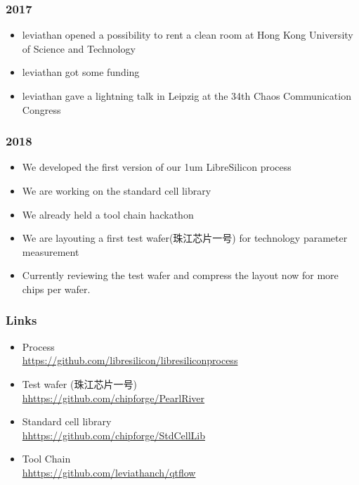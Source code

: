 \documentclass{beamer}
\begin{document}
\begin{frame}
	\frametitle{2017}
	\begin{itemize}
		\item leviathan opened a possibility to rent a clean room at Hong Kong University of Science and Technology
		\item leviathan got some funding
		\item leviathan gave a lightning talk in Leipzig at the 34th Chaos Communication Congress
	\end{itemize}
\end{frame}


\begin{frame}
	\frametitle{2018}
	\begin{itemize}
		\item We developed the first version of our 1um LibreSilicon process
		\item We are working on the standard cell library
		\item We already held a tool chain hackathon
		\item We are layouting a first test wafer({珠江芯片一号}) for technology parameter measurement
		\item Currently reviewing the test wafer and compress the layout now for more chips per wafer.
	\end{itemize}
\end{frame}

\begin{frame}
	\frametitle{Links}
	\begin{itemize}
	\item Process \\
		\url{https://github.com/libresilicon/libresiliconprocess}
	\item Test wafer (珠江芯片一号) \\
		\url{hhttps://github.com/chipforge/PearlRiver}
	\item Standard cell library \\
		\url{hhttps://github.com/chipforge/StdCellLib}
	\item Tool Chain \\
		\url{hhttps://github.com/leviathanch/qtflow}
	\end{itemize}
\end{frame}



\section[Who]{}
\end{document}

